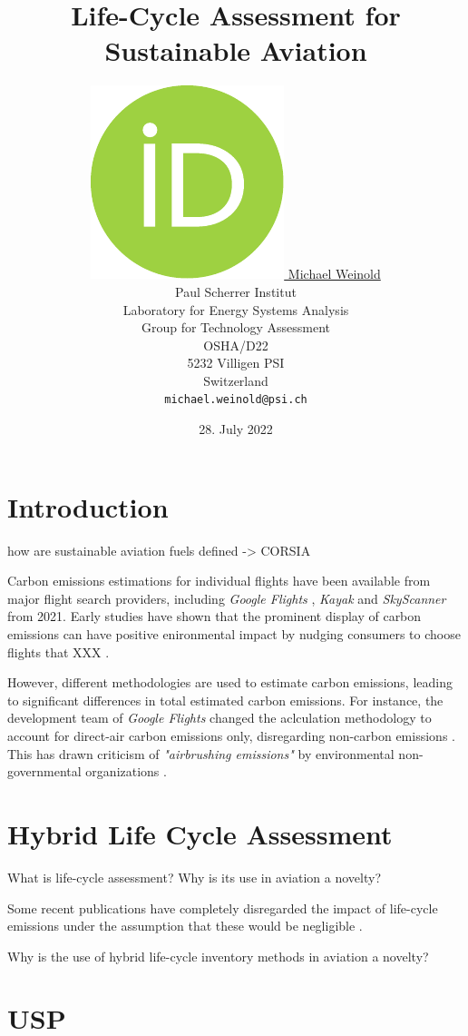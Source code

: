\documentclass{article}
\title{Life-Cycle Assessment for Sustainable Aviation}
\author{
    \href{https://orcid.org/0000-0003-4859-2650}
    {\includegraphics[scale=0.06]{aux/figures/orcid.pdf}
    \hspace{1mm}
    Michael Weinold} \\
	Paul Scherrer Institut\\
	Laboratory for Energy Systems Analysis\\
	Group for Technology Assessment\\
	OSHA/D22\\
    5232 Villigen PSI \\
    Switzerland \\
	\texttt{michael.weinold@psi.ch} \\
}
\date{28. July 2022}
\begin{document}
\maketitle

\begin{abstract}
	\cite{becattini_role_2021}
\end{abstract}


\section{Introduction}

\cite{prussi_corsia_2021}

how are sustainable aviation fuels defined -> CORSIA \cite{prussi_corsia_2021}

    Carbon emissions estimations for individual flights have been available from major flight search providers, including \textit{Google Flights} \cite{holden_google_2021}, \textit{Kayak} \cite{noauthor_kayak_2021} and \textit{SkyScanner} \cite{crosthwaite_how_2021} from 2021. Early studies have shown that the prominent display of carbon emissions can have positive enironmental impact by nudging consumers to choose flights that XXX \cite{amenta_adding_2020}\cite{sanguinetti_nudging_2022}.
    
    However, different methodologies are used to estimate carbon emissions, leading to significant differences in total estimated carbon emissions. For instance, the development team of \textit{Google Flights} changed the aclculation methodology to account for direct-air carbon emissions only, disregarding non-carbon emissions \cite{ali_commit_2022}. This has drawn criticism of \textit{"airbrushing emissions"} by environmental non-governmental organizations \cite{hern_google_2022}\cite{rowlatt_google_2022}.

\section{Hybrid Life Cycle Assessment}

	What is life-cycle assessment?
	Why is its use in aviation a novelty?
	
	Some recent publications have completely disregarded the impact of life-cycle emissions under the assumption that these would be negligible \cite{brazzola_definitions_2022}.
	
	Why is the use of hybrid life-cycle inventory methods in aviation a novelty?
	
\section{USP}
	
\end{document}
